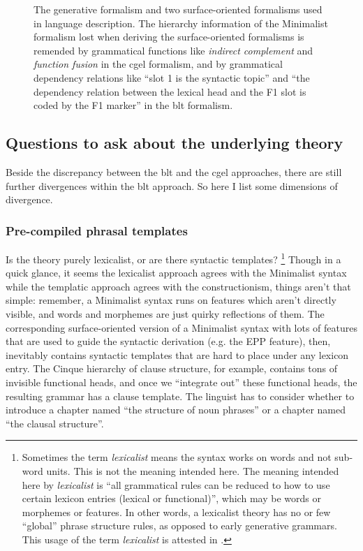 \documentclass[UTF8, a4paper, oneside, scheme=plain]{ctexart}
\newcommand*{\term}[1]{\emph{#1}}
\begin{document}
\begin{figure}
    \centering
    
    \caption{The generative formalism and two surface-oriented formalisms used in language description.
    The hierarchy information of the Minimalist formalism lost when deriving the surface-oriented formalisms 
    is remended by grammatical functions 
    like \term{indirect complement} and \term{function fusion} in the \ac{cgel} formalism,
    and by grammatical dependency relations like ``slot 1 is the syntactic topic''
    and ``the dependency relation between the lexical head and the F1 slot is coded by the F1 marker'' 
    in the \ac{blt} formalism.}
    \label{fig:three-formalism}
\end{figure}

\subsection{Questions to ask about the underlying theory}

Beside the discrepancy between the \ac{blt} and the \ac{cgel} approaches,
there are still further divergences within the \ac{blt} approach.
So here I list some dimensions of divergence.

\subsubsection{Pre-compiled phrasal templates}

Is the theory purely lexicalist, 
or are there syntactic templates?%
\footnote{
    Sometimes the term \term{lexicalist} means the syntax works on words 
    and not sub-word units.
    This is not the meaning intended here. 
    The meaning intended here by \term{lexicalist} is 
    ``all grammatical rules can be reduced to how to use certain lexicon entries (lexical or functional)'',
    which may be words or morphemes or features.
    In other words, a lexicalist theory has no or few ``global'' phrase structure rules,
    as opposed to early generative grammars.
    This usage of the term \term{lexicalist} is attested in \citet{matchin2020cortical}. 
}\label{fn:lexicalist-1}
Though in a quick glance, it seems the lexicalist approach agrees with the Minimalist syntax 
while the templatic approach agrees with the constructionism,
things aren't that simple:
remember, a Minimalist syntax runs on features which aren't directly visible,
and words and morphemes are just quirky reflections of them.
The corresponding surface-oriented version of a Minimalist syntax with lots of features 
that are used to guide the syntactic derivation (e.g. the EPP feature), then,
inevitably contains syntactic templates that are hard to place under any lexicon entry.
The Cinque hierarchy of clause structure, for example, contains tons of invisible functional heads,
and once we ``integrate out'' these functional heads,
the resulting grammar has a clause template.
The linguist has to consider whether to introduce 
a chapter named ``the structure of noun phrases''
or a chapter named ``the clausal structure''.
\end{document}
